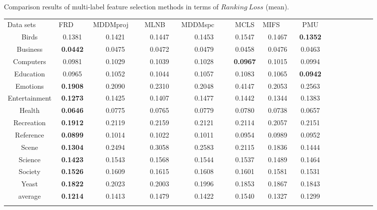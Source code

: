 \documentclass[final,3p,times]{elsarticle}
\begin{document}
\begin{table5-2*}
\begin{center}
\caption{Comparison results of multi-label feature selection methods in terms of $Ranking ~ Loss$ (mean).}
\label{tab:1}
\begin{tabular}{ccccccccccccccc}
\hline\noalign{\smallskip}
Data sets   ~~~~& FRD ~~~& MDDMproj ~~& MLNB  ~~& MDDMspc ~~~& MCLS & MIFS ~~~& PMU \\
\noalign{\smallskip}\hline\noalign{\smallskip}

Birds &	    0.1381  &  0.1421  &  0.1447  &  0.1453   & 0.1547  &  0.1467   & \textbf{0.1352}       \\

Business &	  \textbf{0.0442}  &  0.0475  &  0.0472 &   0.0479  &  0.0458  &  0.0476  &  0.0463  \\

Computers &    0.0981 &   0.1029 &   0.1039 &   0.1028  &  \textbf{0.0967}  &  0.1015 &   0.0994     \\

Education &	   0.0965  &  0.1052  &  0.1044 &   0.1057  &  0.1083  &  0.1065  &  \textbf{0.0942}     \\

Emotions &	  \textbf{0.1908 } &  0.2090 &   0.2310  &  0.2048  &  0.4147   & 0.2053  &  0.2563      \\

Entertainment &  \textbf{0.1273} &   0.1425  &  0.1407 &   0.1477  &  0.1442  &  0.1344 &   0.1383  \\

Health  &	   \textbf{0.0646}  &  0.0775  &  0.0765  &  0.0779  &  0.0780   & 0.0738   & 0.0657    \\

Recreation &     \textbf{0.1912}  &  0.2119  &  0.2159   & 0.2121  &  0.2114   &   0.2057 &   0.2151 \\

Reference &	    \textbf{0.0899}  &  0.1014  &  0.1022  &  0.1011  &  0.0954  &  0.0989  &  0.0952   \\


 Scene &	   \textbf{0.1304}  &  0.2494  &  0.3058  &  0.2583   & 0.2115  &  0.1836   & 0.1444    \\

Science &      \textbf{0.1423}  &  0.1543  &  0.1568  &  0.1544  &  0.1537  &  0.1489   & 0.1464      \\

Society &	   \textbf{0.1526}  &  0.1609  &  0.1615  &  0.1608  &  0.1601  &  0.1581   & 0.1531   \\

 Yeast &	   \textbf{0.1822}  &  0.2023  &  0.2003  &  0.1996  &  0.1853  &  0.1867   & 0.1843     \\

average &     \textbf{0.1214}  &  0.1413  &  0.1479   & 0.1422   & 0.1540  &  0.1327   & 0.1299     \\
\noalign{\smallskip}\hline
\end{tabular}
\end{center}
\end{table5-2*}
\end{document}
